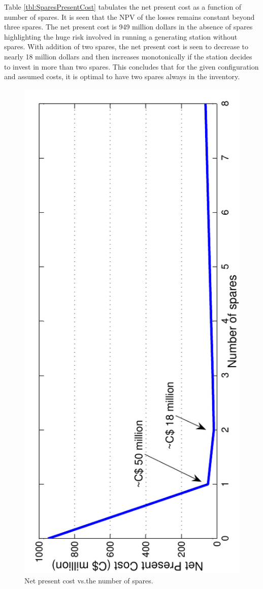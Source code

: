 \documentclass[letterpaper, 12pt]{article}
\begin{document}
Table \ref{tbl:SparesPresentCost} tabulates the net present cost as a function of number of spares. It is seen that the NPV of the losses remains constant beyond three spares. The net present cost is 949 million dollars in the absence of spares highlighting the huge risk involved in running a generating station without spares. With addition of two spares, the net present cost is seen to decrease to nearly 18 million dollars and then increases monotonically if the station decides to invest in more than two spares. This concludes that for the given configuration and assumed costs, it is optimal to have two spares always in the inventory.

\begin{figure}[h!] \centering
  \includegraphics[scale=0.8, angle=-90]{npv}
  \caption{Net present cost vs.the number of spares.\label{fig:npv}} 
\end{figure}
\end{document}
